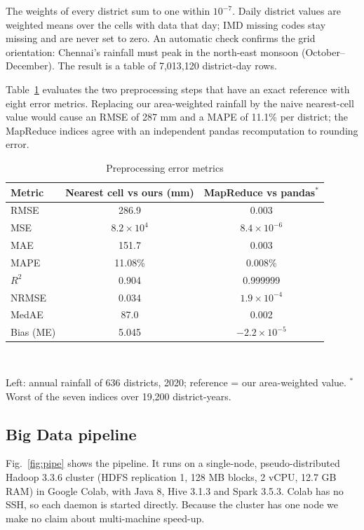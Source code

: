 \documentclass[conference]{IEEEtran}
\begin{document}
The weights of every district sum to one within $10^{-7}$. Daily district values are weighted means over the cells with data that day; IMD missing codes stay missing and are never set to zero. An automatic check confirms the grid orientation: Chennai's rainfall must peak in the north-east monsoon (October--December). The result is a table of 7,013,120 district-day rows.

Table~\ref{tab:prep} evaluates the two preprocessing steps that have an exact reference with eight error metrics. Replacing our area-weighted rainfall by the naive nearest-cell value would cause an RMSE of 287 mm and a MAPE of 11.1\% per district; the MapReduce indices agree with an independent pandas recomputation to rounding error.

\begin{table}[!htb]
\centering
\caption{Preprocessing error metrics}
\label{tab:prep}
\footnotesize
\setlength{\tabcolsep}{3.5pt}
\begin{tabular}{lcc}
\toprule
Metric & Nearest cell vs ours (mm) & MapReduce vs pandas$^{*}$ \\
\midrule
RMSE & 286.9 & 0.003 \\
MSE & $8.2\times10^{4}$ & $8.4\times10^{-6}$ \\
MAE & 151.7 & 0.003 \\
MAPE & 11.08\% & 0.008\% \\
$R^2$ & 0.904 & 0.999999 \\
NRMSE & 0.034 & $1.9\times10^{-4}$ \\
MedAE & 87.0 & 0.002 \\
Bias (ME) & 5.045 & $-2.2\times10^{-5}$ \\
\bottomrule
\end{tabular}
\\[2pt]\parbox{0.95\columnwidth}{\scriptsize Left: annual rainfall of 636 districts, 2020; reference = our area-weighted value. $^{*}$Worst of the seven indices over 19,200 district-years.}
\end{table}

\subsection{Big Data pipeline}
Fig.~\ref{fig:pipe} shows the pipeline. It runs on a single-node, pseudo-distributed Hadoop 3.3.6 cluster (HDFS replication 1, 128 MB blocks, 2 vCPU, 12.7 GB RAM) in Google Colab, with Java 8, Hive 3.1.3 and Spark 3.5.3. Colab has no SSH, so each daemon is started directly. Because the cluster has one node we make no claim about multi-machine speed-up.
\end{document}
